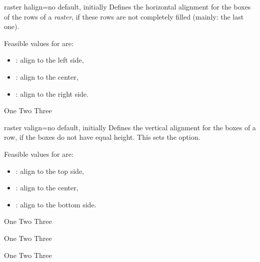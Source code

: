 \begin{docTcbKey}[][doc new=2014-11-10]{raster halign}{=}{no default, initially }
  Defines the horizontal alignment for the boxes of the rows of a \emph{raster},
  if these rows are not completely filled (mainly: the last one).

  Feasible values for  are:
  \begin{itemize}
  \item{}: align to the left side,
  \item{}: align to the center,
  \item{}: align to the right side.
  \end{itemize}

\begin{dispExample}
\begin{tcbitemize}[raster halign=center,
  size=small,colframe=red!50!black,colback=red!10!white]
  \tcbitem One
  \tcbitem Two
  \tcbitem Three
\end{tcbitemize}
\end{dispExample}
\end{docTcbKey}


\begin{docTcbKey}[][doc new=2014-11-10]{raster valign}{=}{no default, initially }
  Defines the vertical alignment for the boxes of a row,
  if the boxes do not have equal height. This sets the
   option.

  Feasible values for  are:
  \begin{itemize}
  \item{}: align to the top side,
  \item{}: align to the center,
  \item{}: align to the bottom side.
  \end{itemize}

\begin{dispExample}
\begin{tcbitemize}[raster valign=top, raster columns=3,
  size=small,colframe=red!50!black,colback=red!10!white]
  \tcbitem \Huge One
  \tcbitem \Large Two
  \tcbitem Three
\end{tcbitemize}
\begin{tcbitemize}[raster valign=center, raster columns=3,
  size=small,colframe=blue!50!black,colback=blue!10!white]
  \tcbitem \Huge One
  \tcbitem \Large Two
  \tcbitem Three
\end{tcbitemize}
\begin{tcbitemize}[raster valign=bottom, raster columns=3,
  size=small,colframe=green!50!black,colback=green!10!white]
  \tcbitem \Huge One
  \tcbitem \Large Two
  \tcbitem Three
\end{tcbitemize}
\end{dispExample}
\end{docTcbKey}


